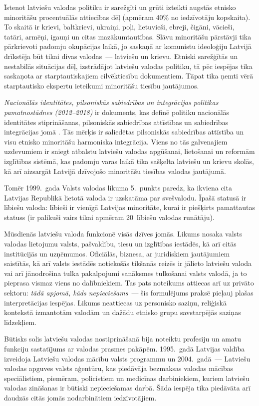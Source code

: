 \begin{multicols}{2}
Īstenot latviešu valodas politiku ir sarežģīti un grūti izteikti augstās etnisko minoritāšu procentuālās attiecības dēļ (apmēram 40\% no iedzīvotāju kopskaita).
To skaitā ir krievi, baltkrievi, ukraiņi, poļi, lietuvieši, ebreji, čigāni, vācieši, tatāri, armēņi, igauņi un citas mazākumtautības.
Slāvu minoritāšu pārstāvji tika pārkrievoti padomju okupācijas laikā, jo saskaņā ar komunistu ideoloģiju Latvijā drīkstēja būt tikai divas valodas~--- latviešu un krievu.
Etniski sarežģītās un nestabilās situācijas dēļ, izstrādājot latviešu valodas politiku, tā pēc iespējas tika saskaņota ar starptautiskajiem cilvēktiesību dokumentiem.
Tāpat tika ņemti vērā starptautisko ekspertu ieteikumi minoritāšu tiesību jautājumos.

\textit{Nacionālās identitātes, pilsoniskās sabiedrības un integrācijas politikas pamatnostādnes (2012–2018)} ir dokuments, kas definē politiku nacionālās identitātes stiprināšanas, pilsoniskās sabiedrības attīstības un sabiedrības integrācijas jomā \cite{Meta3}.
Tās mērķis ir saliedētas pilsoniskās sabiedrības attīstība un visu etnisko minoritāšu harmoniska integrācija. 
Viens no tās galvenajiem uzdevumiem ir sniegt atbalstu latviešu valodas apgūšanai, lietošanai un reformām izglītības sistēmā, kas padomju varas laikā tika sašķelta latviešu un krievu skolās, kā arī aizsargāt Latvijā dzīvojošo minoritāšu tiesības valodas jautājumā.

Tomēr 1999.~gada Valsts valodas likuma 5.~punkts paredz, ka ikviena cita Latvijas Republikā lietotā valoda ir uzskatāma par svešvalodu.
Īpašā statusā ir lībiešu valoda: lībieši ir vienīgā Latvijas minoritāte, kurai ir piešķirts pamattautas statuss (ir palikuši vairs tikai apmēram 20~lībiešu valodas runātāju).

Mūsdienās latviešu valoda funkcionē visās dzīves jomās.
Likums nosaka valsts valodas lietojumu valsts, pašvaldību, tiesu un izglītības iestādēs, kā arī citās institūcijās un uzņēmumos.
Oficiālās, biznesa, ar juridiskiem jautājumiem saistītās, kā arī valsts iestādēs notiekošās tikšanās reizēs ir jālieto latviešu valoda vai arī jānodrošina tulka pakalpojumi sanāksmes tulkošanai valsts valodā, ja to pieprasa vismaz viens no dalībniekiem.
Tas pats noteikums attiecas arī uz privāto sektoru: \textit{tādā apjomā, kāds nepieciešams}~--- šis formulējums praksē pieļauj plašas interpretācijas iespējas.
Likums neattiecas uz personisko saziņu, reliģiskā kontekstā izmantotām valodām un dažādu etnisko grupu savstarpējās saziņas līdzekļiem.

Būtisks solis latviešu valodas nostiprināšanā bija noteiktu profesiju un amatu funkciju sastatījums ar valodas prasmes pakāpēm.
1995.~gadā Latvijas valdība izveidoja Latviešu valodas mācību valsts programmu un 2004.~gadā~--- Latviešu valodas apguves valsts aģentūru, kas piedāvāja bezmaksas valodas mācības speciālistiem, piemēram, policistiem un medicīnas darbiniekiem, kuriem latviešu valodas zināšanas ir būtiski nepieciešamas darbā.
Šāda iespēja tika piedāvāta arī daudzās citās jomās nodarbinātiem iedzīvotājiem.


\end{multicols}

